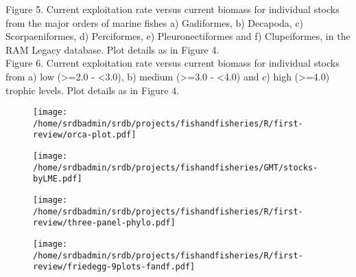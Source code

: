 \documentclass[letterpaper,12pt]{article}
\begin{document}
\noindent Figure 5.  Current exploitation rate versus current biomass for individual stocks from the major orders of marine fishes a) Gadiformes, b) Decapoda, c) Scorpaeniformes, d) Perciformes, e) Pleuronectiformes and f) Clupeiformes, in the RAM Legacy database. Plot details as in Figure 4.
\\

\noindent Figure 6.  Current exploitation rate versus current biomass for individual stocks from a) low (>=2.0 - <3.0), b) medium (>=3.0 - <4.0) and c) high (>=4.0) trophic levels. Plot details as in Figure 4.


\begin{landscape}
\begin{figure}
\begin{center}
\texttt{[image: /home/srdbadmin/srdb/projects/fishandfisheries/R/first-review/orca-plot.pdf]}
\end{center}
\caption{ }\label{fig:orca}
\end{figure}
\end{landscape}

\begin{landscape}
\begin{figure}
\begin{center}
\texttt{[image: /home/srdbadmin/srdb/projects/fishandfisheries/GMT/stocks-byLME.pdf]}
\end{center}
\caption{ }\label{fig:lmes}
\end{figure}
\end{landscape}


\begin{figure}
\begin{center}
\texttt{[image: /home/srdbadmin/srdb/projects/fishandfisheries/R/first-review/three-panel-phylo.pdf]} %
\end{center}
\caption{ }\label{fig:taxo:threepanel}
\end{figure}


\begin{landscape}
\begin{figure}
\begin{center}
\texttt{[image: /home/srdbadmin/srdb/projects/fishandfisheries/R/first-review/friedegg-9plots-fandf.pdf]}
\end{center}
\caption{ }\label{fig:friedegg}
\end{figure}
\end{landscape}
\end{document}

